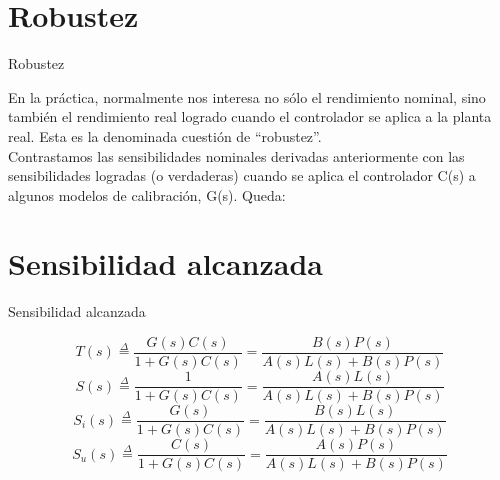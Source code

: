 \documentclass{beamer}
\begin{document}
\section{Robustez}
\begin{frame}{Robustez}
\begin{justify}
\begin{itemize}
\justifying
 En la práctica, normalmente nos interesa no sólo el rendimiento nominal, sino también el rendimiento real logrado cuando el controlador se aplica a la planta real. Esta es la denominada cuestión de “robustez”.
\\
 Contrastamos las sensibilidades nominales derivadas anteriormente con las sensibilidades logradas (o verdaderas) cuando se aplica el controlador C(s) a algunos modelos de calibración, G(s). Queda:

\end{itemize}
\end{justify}
\end{frame}

\section{Sensibilidad alcanzada}
\begin{frame}{Sensibilidad alcanzada}
\begin{justify}
\begin{itemize}

 \begin{equation} \label{sensibilidad1}
    T(s) \stackrel{\Delta}{=} \frac{G(s)C(s)}{1+G(s)C(s)} = \frac{B(s)P(s)}{A(s)L(s) + B(s)P(s)}
\end{equation}
\begin{equation}\label{sensibilidad2}
    S(s) \stackrel{\Delta}{=} \frac{1}{1+G(s)C(s)} = \frac{A(s)L(s)}{A(s)L(s) + B(s)P(s)}
\end{equation}
\begin{equation}\label{sensibilidad3}
    S_{i} (s) \stackrel{\Delta}{=} \frac{G(s)}{1+G(s)C(s)} = \frac{B(s)L(s)}{A(s)L(s) + B(s)P(s)}
\end{equation}
\begin{equation}\label{sensibilidad4}
    S_{u} (s) \stackrel{\Delta}{=} \frac{C(s)}{1+G(s)C(s)} = \frac{A(s)P(s)}{A(s)L(s) + B(s)P(s)}
\end{equation}
\end{itemize}
\end{justify}
\end{frame}
\end{document}
